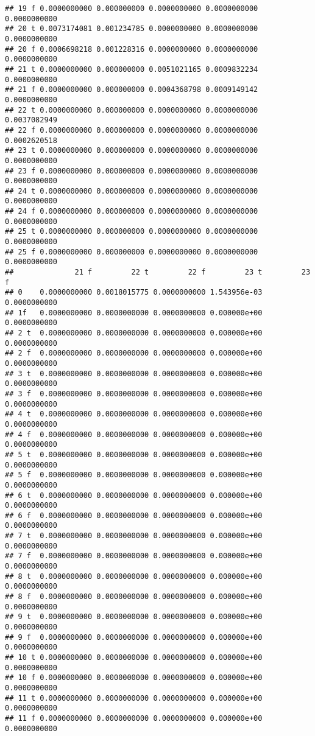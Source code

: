\documentclass[]{article}
\begin{document}
\begin{verbatim}
## 19 f 0.0000000000 0.000000000 0.0000000000 0.0000000000 0.0000000000
## 20 t 0.0073174081 0.001234785 0.0000000000 0.0000000000 0.0000000000
## 20 f 0.0006698218 0.001228316 0.0000000000 0.0000000000 0.0000000000
## 21 t 0.0000000000 0.000000000 0.0051021165 0.0009832234 0.0000000000
## 21 f 0.0000000000 0.000000000 0.0004368798 0.0009149142 0.0000000000
## 22 t 0.0000000000 0.000000000 0.0000000000 0.0000000000 0.0037082949
## 22 f 0.0000000000 0.000000000 0.0000000000 0.0000000000 0.0002620518
## 23 t 0.0000000000 0.000000000 0.0000000000 0.0000000000 0.0000000000
## 23 f 0.0000000000 0.000000000 0.0000000000 0.0000000000 0.0000000000
## 24 t 0.0000000000 0.000000000 0.0000000000 0.0000000000 0.0000000000
## 24 f 0.0000000000 0.000000000 0.0000000000 0.0000000000 0.0000000000
## 25 t 0.0000000000 0.000000000 0.0000000000 0.0000000000 0.0000000000
## 25 f 0.0000000000 0.000000000 0.0000000000 0.0000000000 0.0000000000
##              21 f         22 t         22 f         23 t         23 f
## 0    0.0000000000 0.0018015775 0.0000000000 1.543956e-03 0.0000000000
## 1f   0.0000000000 0.0000000000 0.0000000000 0.000000e+00 0.0000000000
## 2 t  0.0000000000 0.0000000000 0.0000000000 0.000000e+00 0.0000000000
## 2 f  0.0000000000 0.0000000000 0.0000000000 0.000000e+00 0.0000000000
## 3 t  0.0000000000 0.0000000000 0.0000000000 0.000000e+00 0.0000000000
## 3 f  0.0000000000 0.0000000000 0.0000000000 0.000000e+00 0.0000000000
## 4 t  0.0000000000 0.0000000000 0.0000000000 0.000000e+00 0.0000000000
## 4 f  0.0000000000 0.0000000000 0.0000000000 0.000000e+00 0.0000000000
## 5 t  0.0000000000 0.0000000000 0.0000000000 0.000000e+00 0.0000000000
## 5 f  0.0000000000 0.0000000000 0.0000000000 0.000000e+00 0.0000000000
## 6 t  0.0000000000 0.0000000000 0.0000000000 0.000000e+00 0.0000000000
## 6 f  0.0000000000 0.0000000000 0.0000000000 0.000000e+00 0.0000000000
## 7 t  0.0000000000 0.0000000000 0.0000000000 0.000000e+00 0.0000000000
## 7 f  0.0000000000 0.0000000000 0.0000000000 0.000000e+00 0.0000000000
## 8 t  0.0000000000 0.0000000000 0.0000000000 0.000000e+00 0.0000000000
## 8 f  0.0000000000 0.0000000000 0.0000000000 0.000000e+00 0.0000000000
## 9 t  0.0000000000 0.0000000000 0.0000000000 0.000000e+00 0.0000000000
## 9 f  0.0000000000 0.0000000000 0.0000000000 0.000000e+00 0.0000000000
## 10 t 0.0000000000 0.0000000000 0.0000000000 0.000000e+00 0.0000000000
## 10 f 0.0000000000 0.0000000000 0.0000000000 0.000000e+00 0.0000000000
## 11 t 0.0000000000 0.0000000000 0.0000000000 0.000000e+00 0.0000000000
## 11 f 0.0000000000 0.0000000000 0.0000000000 0.000000e+00 0.0000000000

\end{verbatim}
\end{document}
